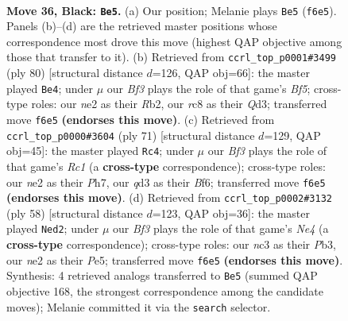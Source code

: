 \documentclass[11pt]{article}
\begin{document}
\clearpage

\begin{figure}[p]\centering
\begin{subfigure}{0.46\textwidth}\centering
\resizebox{\linewidth}{!}{%
\newchessgame
\chessboard[
  setfen={rnR5/3n1k2/p2p1b2/3P4/6P1/q1NQ4/4N3/4K3 b - - 3 36},
  showmover=false,
  pgfstyle=straightmove, color=movearrow, markmove={f6-e5}
]}
\caption{}
\end{subfigure}\hfill
\begin{subfigure}{0.46\textwidth}\centering
\resizebox{\linewidth}{!}{%
\newchessgame
\chessboard[
  setfen={5b1k/2r5/p1n2P2/3qpB1p/3n2N1/3QB2P/PR6/6K1 w - - 0 41},
  showmover=false,
  pgfstyle=straightmove, color=movearrow, markmove={f5-e4}
]}
\caption{}
\end{subfigure}
\\[4pt]
\begin{subfigure}{0.46\textwidth}\centering
\resizebox{\linewidth}{!}{%
\newchessgame
\chessboard[
  setfen={2r3k1/7p/4pbp1/7n/4q2P/3NP3/P4PR1/3QN1K1 b - - 1 36},
  showmover=false,
  pgfstyle=straightmove, color=movearrow, markmove={c8-c4}
]}
\caption{}
\end{subfigure}\hfill
\begin{subfigure}{0.46\textwidth}\centering
\resizebox{\linewidth}{!}{%
\newchessgame
\chessboard[
  setfen={1r3nk1/5pp1/4p3/3nP2P/3RN3/qP3N2/2Q2P2/6K1 w - - 1 30},
  showmover=false,
  pgfstyle=straightmove, color=movearrow, markmove={e4-d2}
]}
\caption{}
\end{subfigure}
\caption{\textbf{Move 36, Black: \texttt{Be5}.} (a) Our position; Melanie plays \texttt{Be5} (\texttt{f6e5}). Panels (b)--(d) are the retrieved master positions whose correspondence most drove this move (highest QAP objective among those that transfer to it). (b) Retrieved from \texttt{ccrl\_top\_p0001\#3499} (ply 80) [structural distance $d$=126, QAP obj=66]: the master played \texttt{Be4}; under $\mu$ our \emph{Bf3} plays the role of that game's \emph{Bf5}; cross-type roles: our \emph{n}e2 as their \emph{R}b2, our \emph{r}c8 as their \emph{Q}d3; transferred move \texttt{f6e5} \textbf{(endorses this move)}. (c) Retrieved from \texttt{ccrl\_top\_p0000\#3604} (ply 71) [structural distance $d$=129, QAP obj=45]: the master played \texttt{Rc4}; under $\mu$ our \emph{Bf3} plays the role of that game's \emph{Rc1} (a \textbf{cross-type} correspondence); cross-type roles: our \emph{n}e2 as their \emph{P}h7, our \emph{q}d3 as their \emph{B}f6; transferred move \texttt{f6e5} \textbf{(endorses this move)}. (d) Retrieved from \texttt{ccrl\_top\_p0002\#3132} (ply 58) [structural distance $d$=123, QAP obj=36]: the master played \texttt{Ned2}; under $\mu$ our \emph{Bf3} plays the role of that game's \emph{Ne4} (a \textbf{cross-type} correspondence); cross-type roles: our \emph{n}c3 as their \emph{P}b3, our \emph{n}e2 as their \emph{P}e5; transferred move \texttt{f6e5} \textbf{(endorses this move)}. Synthesis: 4 retrieved analogs transferred to \texttt{Be5} (summed QAP objective 168, the strongest correspondence among the candidate moves); Melanie committed it via the \texttt{search} selector.}
\label{fig:thought-m71}
\end{figure}
\end{document}

